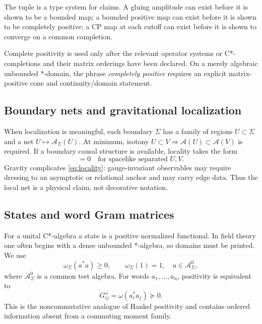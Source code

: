 \documentclass[11pt,a4paper]{article}
\theoremstyle{definition}
\theoremstyle{remark}
\newcommand{\A}{\mathcal A}
\begin{document}
The tuple is a type system for claims.  A gluing amplitude can exist before it
is shown to be a bounded map; a bounded positive map can exist before it is
shown to be completely positive; a CP map at each cutoff can exist before it
is shown to converge on a common completion.

Complete positivity is used only after the relevant operator systems or
C*-completions and their matrix orderings have been declared.  On a merely
algebraic unbounded $*$-domain, the phrase \emph{completely positive} requires
an explicit matrix-positive cone and continuity/domain statement.

\subsection{Boundary nets and gravitational localization}

When localization is meaningful, each boundary $\Sigma$ has a family of
regions $U\subset\Sigma$ and a net $U\mapsto\A_\Sigma(U)$.  At minimum,
isotony $U\subset V\Rightarrow\A(U)\subset\A(V)$ is required.  If a boundary causal structure is
available, locality takes the form
\begin{equation}
   [\A_\Sigma(U),\A_\Sigma(V)]=0
   \quad\text{for spacelike separated }U,V.
   \label{eq:locality}
\end{equation}
Gravity complicates \eqref{eq:locality}: gauge-invariant observables may
require dressing to an asymptotic or relational anchor and may carry edge
data.  Thus the local net is a physical claim, not decorative notation.

\subsection{States and word Gram matrices}

For a unital C*-algebra a state is a positive normalized functional.  In field
theory one often begins with a dense unbounded $*$-algebra, so domains must be
printed.  We use
\begin{equation}
   \omega_\Sigma(a^*a)\ge 0,\qquad \omega_\Sigma(1)=1,
   \quad a\in\A_\Sigma^0 ,
   \label{eq:state-positive}
\end{equation}
where $\A_\Sigma^0$ is a common test algebra.  For words
$a_1,\ldots,a_n$, positivity is equivalent to
\begin{equation}
  G^\omega_{ij}=\omega(a_i^*a_j)\succeq0 .
  \label{eq:nc-gram}
\end{equation}
This is the noncommutative analogue of Hankel positivity and contains ordered
information absent from a commuting moment family.
\end{document}
